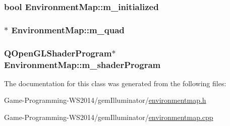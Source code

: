\subsubsection[{m\+\_\+initialized}]{\setlength{\rightskip}{0pt plus 5cm}bool Environment\+Map\+::m\+\_\+initialized\hspace{0.3cm}{\ttfamily [protected]}}\label{class_environment_map_af40184d2ae6b58e909fd3c6bf1c32284}
\hypertarget{class_environment_map_a2d4e6cabcbc17b659bf6dbc68069767c}{}
\subsubsection[{m\+\_\+quad}]{$\ast$ Environment\+Map\+::m\+\_\+quad\hspace{0.3cm}{\ttfamily [protected]}}\label{class_environment_map_a2d4e6cabcbc17b659bf6dbc68069767c}
\hypertarget{class_environment_map_aab51ee095ecbe9fcaab64d5c8d3b3ab3}{}
\subsubsection[{m\+\_\+shader\+Program}]{\setlength{\rightskip}{0pt plus 5cm}Q\+Open\+G\+L\+Shader\+Program$\ast$ Environment\+Map\+::m\+\_\+shader\+Program\hspace{0.3cm}{\ttfamily [protected]}}\label{class_environment_map_aab51ee095ecbe9fcaab64d5c8d3b3ab3}


The documentation for this class was generated from the following files\+:\begin{DoxyCompactItemize}
\item 
Game-\/\+Programming-\/\+W\+S2014/gem\+Illuminator/\hyperlink{environmentmap_8h}{environmentmap.\+h}\item 
Game-\/\+Programming-\/\+W\+S2014/gem\+Illuminator/\hyperlink{environmentmap_8cpp}{environmentmap.\+cpp}\end{DoxyCompactItemize}
